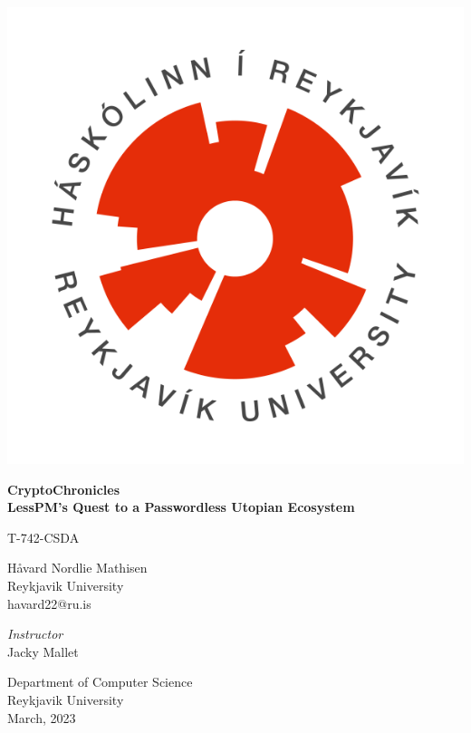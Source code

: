 \documentclass{article}
\title{\titleHeading}
\author{Håvard Nordlie Mathisen}
\date{January, 2023}
\newcommand{\jacky}{Jacky Mallet}
\newcommand{\secu}{T-742-CSDA}
\newcommand{\titleHeading}{CryptoChronicles}
\newcommand{\titleSubheading}{LessPM's Quest to a Passwordless Utopian Ecosystem}
\newcommand{\subjectName}{\secu}
\newcommand{\instructorName}{\jacky}
\begin{document}
    \begin{titlepage}
        \begin{center}
            \includegraphics[scale=0.4]{images/HR_logo_hringur_transparent}

            \huge
            \textbf{\titleHeading}\\
            \Large
            \textbf{\titleSubheading}

            \vspace{1cm}
            \large
            \subjectName

            \vspace{0.5cm}
            \Large
            Håvard Nordlie Mathisen\\
            \large
            Reykjavik University\\
            havard22@ru.is


            \vfill

            \normalsize
            \textit{Instructor}\\
            \instructorName

            \vspace{0.8cm}

            Department of Computer Science\\
            Reykjavik University\\
            March, 2023\\

        \end{center}
    \end{titlepage}
\end{document}

